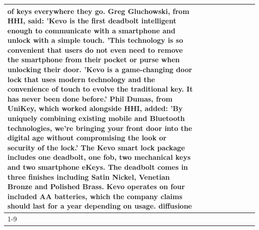 \begin{table}[H]
\begin{tabular}{lllrlllll}
of keys everywhere they go. Greg Gluchowski, from HHI, said: 'Kevo is the first deadbolt intelligent enough to communicate with a smartphone and unlock with a simple touch. 'This technology is so convenient that users do not even need to remove the smartphone from their pocket or purse when unlocking their door. 'Kevo is a game-changing door lock that uses modern technology and the convenience of touch to evolve the traditional key. It has never been done before.' Phil Dumas, from UniKey, which worked alongside HHI, added: 'By uniquely combining existing mobile and Bluetooth technologies, we’re bringing your front door into the digital age without compromising the look or security of the lock.' The Kevo smart lock package includes one deadbolt, one fob, two mechanical keys and two smartphone eKeys. The deadbolt comes in three finishes including Satin Nickel, Venetian Bronze and Polished Brass. Kevo operates on four included AA batteries, which the company claims should last for a year depending on usage. diffusione \\
\cline{1-9}

\end{tabular}
\end{table}
